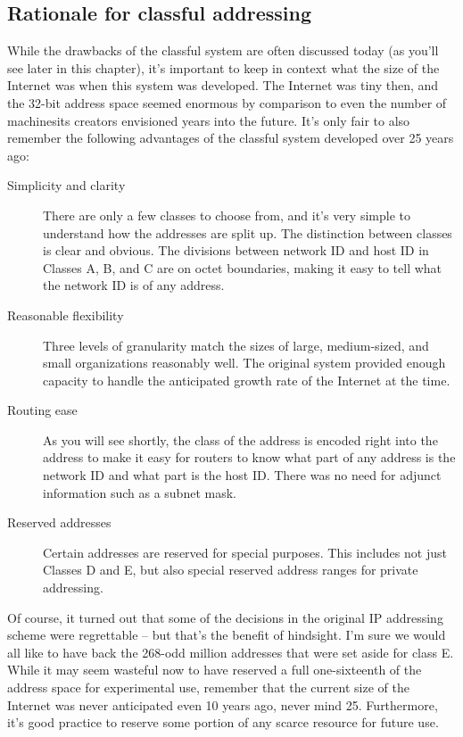 \subsection{Rationale for classful addressing}

While the drawbacks of the classful system are often discussed today (as
you'll see later in this chapter), it's important to keep in context
what the size of the Internet was when this system was developed. The
Internet was tiny then, and the 32-bit address space seemed enormous by
comparison to even the number of machinesits creators envisioned years
into the future. It's only fair to also remember the following
advantages of the classful system developed over 25 years ago:

\begin{description}
   \item[Simplicity and clarity]
      There are only a few classes to choose from, and it's very simple to understand how the addresses are split up.
      The distinction between classes is clear and obvious.
      The divisions between network ID and host ID in Classes A, B, and C are on octet boundaries, making it easy to tell what the network ID is of any address.

   \item[Reasonable flexibility]
      Three levels of granularity match the sizes of large, medium-sized, and small organizations reasonably well.
      The original system provided enough capacity to handle the anticipated growth rate of the Internet at the time.

   \item[Routing ease]
      As you will see shortly, the class of the address is encoded right into the address to make it easy for routers to know what part of any address is the network ID and what part is the host ID.
      There was no need for adjunct information such as a subnet mask.

   \item[Reserved addresses]
      Certain addresses are reserved for special purposes.
      This includes not just Classes D and E, but also special reserved address ranges for private addressing.
   \end{description}

Of course, it turned out that some of the decisions in the original IP addressing scheme were regrettable -- but that's the benefit of hindsight.
I'm sure we would all like to have back the 268-odd million addresses that were set aside for class E.
While it may seem wasteful now to have reserved a full one-sixteenth of the address space for experimental use, remember that the current size of the Internet was never anticipated even 10 years ago, never mind 25.
Furthermore, it's good practice to reserve some portion of any scarce resource for future use.




